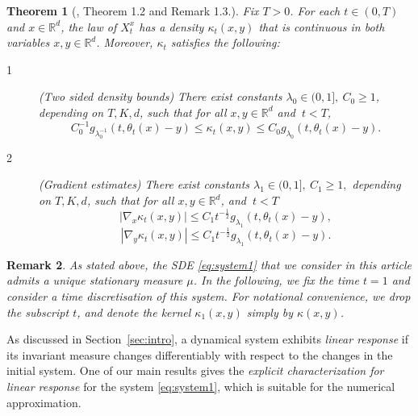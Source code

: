 \documentclass{amsart}
\newtheorem{theorem}{Theorem}
\newtheorem{remark}[theorem]{Remark}
\begin{document}
\begin{theorem}[\protect\cite{MPZ}, Theorem 1.2 and Remark 1.3.]
\label{MPZ} 
Fix \(T>0\).  For each \(t\in(0,T)\) and \(x\in\mathbb{R}^{d}\), the law of \(X_{t}^{x}\) has a density $\kappa_t(x,y)$ that is
continuous in both variables $x,y \in \mathbb{R}^d$. Moreover, $\kappa_t$ satisfies the following:

\begin{description}
\item[1] (Two sided density bounds) There exist  constants $\lambda _{0}\in
(0,1], ~C_{0}\geq 1$, depending on $T,K,d$, such that for all $x,y\in \mathbb{R}%
^{d}$ and $~t<T$,%
\begin{equation*}
C_{0}^{-1}g_{\lambda _{0}^{-1}}(t,\theta _{t}(x)-y)\leq \kappa_t(x,y)\leq
C_{0}g_{\lambda _{0}}(t,\theta _{t}(x)-y).
\end{equation*}

\item[2] (Gradient estimates) There exist constants $\lambda _{1}\in (0,1],~C_{1}\geq 1,
$ depending on $T,K,d$, such that for all $x,y\in \mathbb{R}^{d}$, and $~t<T$%
\begin{equation*}
|\nabla _{x} \kappa_{t}(x,y)|\leq C_{1}t^{-\frac{1}{2}}g_{\lambda _{1}}(t,\theta
_{t}(x)-y),
\end{equation*}%
\begin{equation*}
|\nabla _{y} \kappa_{t}(x,y)|\leq C_{1}t^{-\frac{1}{2}}g_{\lambda _{1}}(t,\theta
_{t}(x)-y).
\end{equation*}
\end{description}
\end{theorem}

\begin{remark}\label{rem:no_t}
    As stated above, the SDE \eqref{eq:system1} that we consider in this article admits a unique stationary measure $\mu$.
   In the following, we fix the time $t=1$ and consider a time discretisation of this system. For notational convenience, we drop the subscript $t$, and denote the kernel $\kappa_1(x,y)$ simply by $\kappa(x,y)$.
\end{remark}

As discussed in Section~\ref{sec:intro}, a dynamical system exhibits \emph{linear response} if its invariant measure changes differentiably with respect to the changes in the initial system. One of our main results gives the \emph{explicit characterization for linear response} for the system \eqref{eq:system1}, which is suitable for the numerical approximation. 
\end{document}
